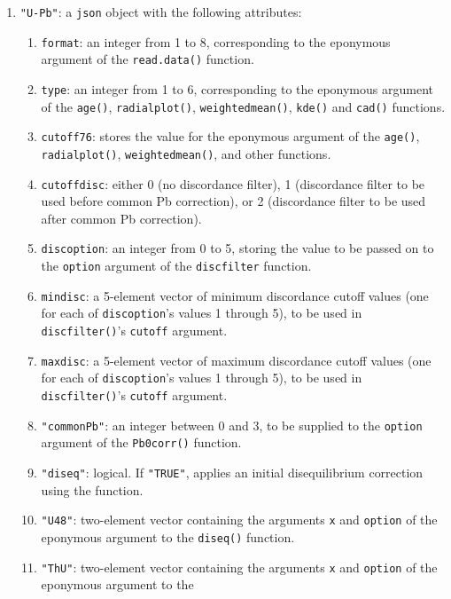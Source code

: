 \begin{refsection}
\begin{enumerate}[leftmargin=\parindent,align=left,
      labelwidth=\parindent,label*=2.\arabic*.]
\begin{enumerate}[leftmargin=\parindent,align=left,labelwidth=\parindent,label*=\arabic*.]
    samples to be omitted from the plots.
  \end{enumerate}
\item{\tt "U-Pb"}: a \texttt{json} object with the following
  attributes:
  \begin{enumerate}[leftmargin=\parindent,align=left,labelwidth=\parindent,label*=\arabic*.]
  \item{\tt format}: an integer from 1 to 8, corresponding to the
    eponymous argument of the \texttt{read.data()} function.
  \item{\tt type}: an integer from 1 to 6, corresponding to the
    eponymous argument of the \texttt{age()}, \texttt{radialplot()},
    \texttt{weightedmean()}, \texttt{kde()} and \texttt{cad()}
    functions.
  \item{\tt cutoff76}: stores the value for the eponymous argument of
    the \texttt{age()}, \texttt{radialplot()},
    \texttt{weightedmean()}, and other functions.
  \item{\tt cutoffdisc}: either 0 (no discordance filter), 1
    (discordance filter to be used before common Pb correction), or 2
    (discordance filter to be used after common Pb correction).
  \item{\tt discoption}: an integer from 0 to 5, storing the value to be
    passed on to the \texttt{option} argument of the
    \texttt{discfilter} function.
  \item{\tt mindisc}: a 5-element vector of minimum discordance cutoff
    values (one for each of \texttt{discoption}'s values 1 through 5),
    to be used in \texttt{discfilter()}'s \texttt{cutoff} argument.
  \item{\tt maxdisc}: a 5-element vector of maximum discordance cutoff
    values (one for each of \texttt{discoption}'s values 1 through 5),
    to be used in \texttt{discfilter()}'s \texttt{cutoff} argument.
  \item{\tt "commonPb"}: an integer between 0 and 3, to be supplied to
    the \texttt{option} argument of the \texttt{Pb0corr()} function.
  \item{\tt "diseq"}: logical. If \texttt{"TRUE"}, applies an initial
    disequilibrium correction using the  function.
  \item{\tt "U48"}: two-element vector containing the arguments
    \texttt{x} and \texttt{option} of the eponymous argument to the
    \texttt{diseq()} function.
  \item{\tt "ThU"}: two-element vector containing the arguments
    \texttt{x} and \texttt{option} of the eponymous argument to the

\end{enumerate}
\end{enumerate}
\end{refsection}
